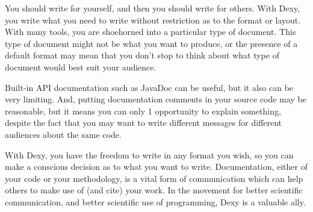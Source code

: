 \documentclass[custom, plainsections]{sciposter}
\begin{document}
\begin{multicols*}{3}
You should write for yourself, and then you should write for others. With Dexy, you write what you need to write without restriction as to the format or layout. With many tools, you are shoehorned into a particular type of document. This type of document might not be what you want to produce, or the presence of a default format may mean that you don't stop to think about what type of document would best suit your audience.

Built-in API documentation such as JavaDoc can be useful, but it also can be very limiting. And, putting documentation comments in your source code may be reasonable, but it means you can only 1 opportunity to explain something, despite the fact that you may want to write different messages for different audiences about the same code.

With Dexy, you have the freedom to write in any format you wish, so you can make a conscious decision as to what you want to write. Documentation, either of your code or your methodology, is a vital form of communication which can help others to make use of (and cite) your work. In the movement for better scientific communication, and better scientific use of programming, Dexy is a valuable ally.

\end{multicols*}


\pagebreak
\end{document}
